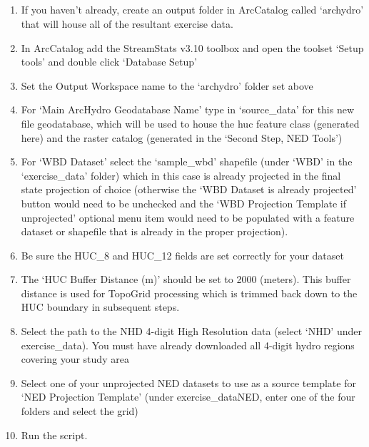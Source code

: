 \documentclass[letterpaper,10pt,english]{sphinxmanual}
\begin{document}
\subparagraph{}
\label{\detokenize{ex_1:step-1a-creating-the-containing-folders}}\begin{enumerate}
\def\theenumi{\arabic{enumi}}
\def\labelenumi{\theenumi .}
\makeatletter\def\p@enumii{\p@enumi \theenumi .}\makeatother
\item {} 
If you haven’t already, create an output folder in ArcCatalog called ‘archydro’ that will house all of the resultant exercise data.

\item {} 
In ArcCatalog add the StreamStats v3.10 toolbox and open the toolset ‘Setup tools’ and double click ‘Database Setup’

\item {} 
Set the Output Workspace name to the ‘archydro’ folder set above

\item {} 
For ‘Main ArcHydro Geodatabase Name’ type in ‘source\_data’ for this new file geodatabase, which will be used to house the huc feature class (generated here) and the raster catalog (generated in the ‘Second Step, NED Tools’)

\item {} 
For ‘WBD Dataset’ select the ‘sample\_wbd’ shapefile (under ‘WBD’ in the ‘exercise\_data’ folder) which in this case is already projected in the final state projection of choice (otherwise the ‘WBD Dataset is already projected’ button would need to be unchecked and the ‘WBD Projection Template if unprojected’ optional menu item would need to be populated with a feature dataset or shapefile that is already in the proper projection).

\item {} 
Be sure the HUC\_8 and HUC\_12 fields are set correctly for your dataset

\item {} 
The ‘HUC Buffer Distance (m)’ should be set to 2000 (meters).  This buffer distance is used for TopoGrid processing which is trimmed back down to the HUC boundary in subsequent steps.

\item {} 
Select the path to the NHD 4-digit High Resolution data (select ‘NHD’ under exercise\_data).  You must have already downloaded all 4-digit hydro regions covering your study area

\item {} 
Select one of your unprojected NED datasets to use as a source template for ‘NED Projection Template’ (under exercise\_dataNED, enter one of the four folders and select the grid)

\item {} 
Run the script.

\end{enumerate}
\end{document}
